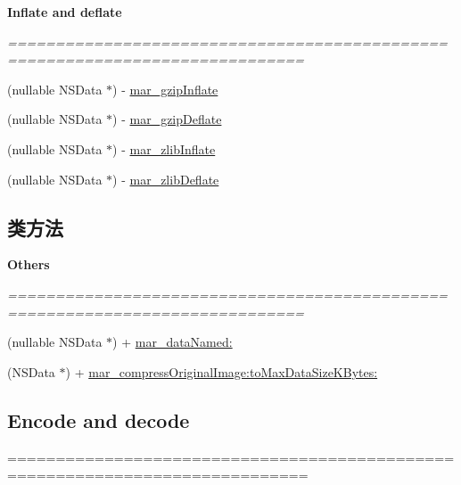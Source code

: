 \begin{Indent}\textbf{ Inflate and deflate}\par
{\em ============================================================================= 

 }\begin{DoxyCompactItemize}
\item 
(nullable N\+S\+Data $\ast$) -\/ \hyperlink{category_n_s_data_07_m_a_r_e_x_08_a7b19375aaba59ac74ea638dcd2e27a81}{mar\+\_\+gzip\+Inflate}
\item 
(nullable N\+S\+Data $\ast$) -\/ \hyperlink{category_n_s_data_07_m_a_r_e_x_08_a8a8055c8b6ebfe96d1a49ba5ecff40d7}{mar\+\_\+gzip\+Deflate}
\item 
(nullable N\+S\+Data $\ast$) -\/ \hyperlink{category_n_s_data_07_m_a_r_e_x_08_a34e39334da82728340d3ba03f38cfeba}{mar\+\_\+zlib\+Inflate}
\item 
(nullable N\+S\+Data $\ast$) -\/ \hyperlink{category_n_s_data_07_m_a_r_e_x_08_a9b121c34430b53da343dcecad0c9e393}{mar\+\_\+zlib\+Deflate}
\end{DoxyCompactItemize}
\end{Indent}
\subsection*{类方法}
\begin{Indent}\textbf{ Others}\par
{\em ============================================================================= 

 }\begin{DoxyCompactItemize}
\item 
(nullable N\+S\+Data $\ast$) + \hyperlink{category_n_s_data_07_m_a_r_e_x_08_a1faf6f0eecf56c7ccc72a8fa3169c418}{mar\+\_\+data\+Named\+:}
\item 
(N\+S\+Data $\ast$) + \hyperlink{category_n_s_data_07_m_a_r_e_x_08_af0e50e8467f9065c6a2da6f372d04ceb}{mar\+\_\+compress\+Original\+Image\+:to\+Max\+Data\+Size\+K\+Bytes\+:}
\end{DoxyCompactItemize}
\end{Indent}
\subsection*{Encode and decode}
\label{_amgrp564394bc5aa2aafec283d1d4c37dc238}%
============================================================================= 

